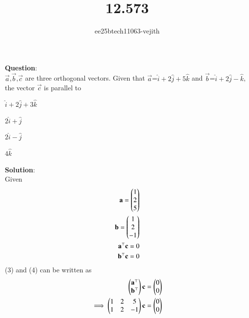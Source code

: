 \documentclass[journal]{IEEEtran}
\begin{document}

\vspace{3cm}

\title{12.573}
\author{ee25btech11063-vejith}

\maketitle
{\let\newpage\relax\maketitle}
\renewcommand{\thefigure}{\theenumi}
\renewcommand{\thetable}{\theenumi}
\setlength{\intextsep}{10pt} %
\textbf{Question}:\\
$\Vec{a}$,$\Vec{b}$,$\Vec{c}$ are three orthogonal vectors. Given that $\vec{a}$=$\hat{i} + 2\hat{j} + 5\hat{k}$ and $\Vec{b}$=$\hat{i} + 2\hat{j} -\hat{k}$, the vector $\vec{c}$ is parallel to \hspace{2.5cm} 
\begin{enumerate}[label=(\alph*)]
    \begin{multicols}{4}
        \item $\hat{i} + 2\hat{j} + 3\hat{k}$
        \item $2\hat{i} + \hat{j}$
        \item $2\hat{i} - \hat{j}$
        \item $4\hat{k}$
    \end{multicols}
\end{enumerate}
\textbf{Solution}:\\
Given 
\begin{align}
    \mathbf{a}=\begin{pmatrix}1\\2\\5\end{pmatrix}\\
    \mathbf{b}=\begin{pmatrix}1\\2\\-1\end{pmatrix}\\
    \mathbf{a}^\top\mathbf{c}=0\\
    \mathbf{b}^\top\mathbf{c}=0
\end{align}
(3) and (4) can be written as
\begin{align}
    \begin{pmatrix}\mathbf{a}^\top \\ \mathbf{b}^\top\end{pmatrix}\mathbf{c}=\begin{pmatrix}0\\0\end{pmatrix}\\
    \implies \begin{pmatrix}
        1 & 2 & 5\\
        1 & 2 & -1
    \end{pmatrix}\mathbf{c}=\begin{pmatrix}0\\0\end{pmatrix}
\end{align}
\end{document}

